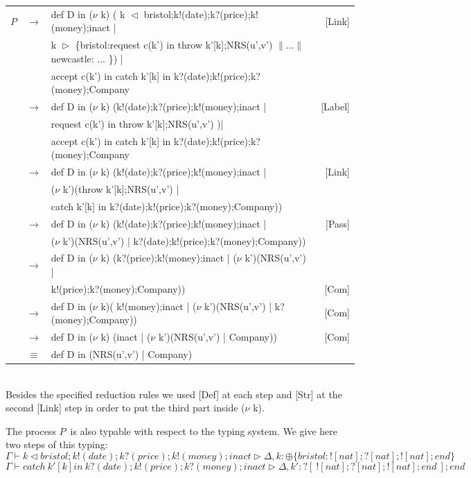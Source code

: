 \documentclass{article}
\newcommand{\PP}{\ensuremath{P}}
\newcommand{\Ga}{\ensuremath{\Gamma}}
\newcommand{\D}{\ensuremath{\Delta}}
\newcommand{\der}[3]{\ensuremath{#1\vdash#2\triangleright#3}}
\begin{document}
\begin{tabular}{lclr}
\PP& $\rightarrow$ &def D in ($\nu$ k) ( k $\vartriangleleft$ bristol;k!(date);k?(price);k!(money);inact | & [Link]\\
&& k $\vartriangleright$ \{bristol:request c(k') in throw k'[k];NRS(u',v') $\| ...\|$ newcastle: ... \}) |&  \\
&&accept c(k') in catch k'[k] in k?(date);k!(price);k?(money);Company&  \\
& $\rightarrow$  & def D in ($\nu$ k) (k!(date);k?(price);k!(money);inact | &[Label]\\
&& request c(k') in throw k'[k];NRS(u',v')  )|&\\
&&accept c(k') in catch k'[k] in k?(date);k!(price);k?(money);Company&\\
& $\rightarrow$  & def D in ($\nu$ k) (k!(date);k?(price);k!(money);inact | & [Link]\\
&& ($\nu$ k')(throw k'[k];NRS(u',v') | &\\
&&catch k'[k] in k?(date);k!(price);k?(money);Company))&\\
& $\rightarrow$  & def D in ($\nu$ k) (k!(date);k?(price);k!(money);inact | & [Pass]\\
&& ($\nu$ k')(NRS(u',v') |  k?(date);k!(price);k?(money);Company))&\\
& $\rightarrow$  & def D in ($\nu$ k) (k?(price);k!(money);inact |  ($\nu$ k')(NRS(u',v') |  &\\
&&k!(price);k?(money);Company))& [Com]\\
& $\rightarrow$  & def D in ($\nu$ k)( k!(money);inact | ($\nu$ k')(NRS(u',v') |  k?(money);Company))&[Com]\\
& $\rightarrow$  & def D in ($\nu$ k) (inact |  ($\nu$ k')(NRS(u',v') | Company))& [Com]\\
& $\equiv$  & def D in (NRS(u',v') | Company) & \\
\end{tabular}
\\

Besides the specified reduction rules we used [Def] at each step and [Str] at the second [Link] step in order to put the third part inside ($\nu$ k).

The process \PP~is also typable with respect to the typing system. We give here two steps of this typing:
\[ \der \Ga { k \vartriangleleft bristol;k!(date);k?(price);k!(money);inact}\D,k:\oplus \{ bristol:![nat];?[nat];![nat];end\}\]
\[ \der \Ga {catch~ k'[k] in~ k?(date);k!(price);k?(money);inact}\D,k':?[~ ![nat];?[nat];![nat];end~ ];end\]
\end{document}
